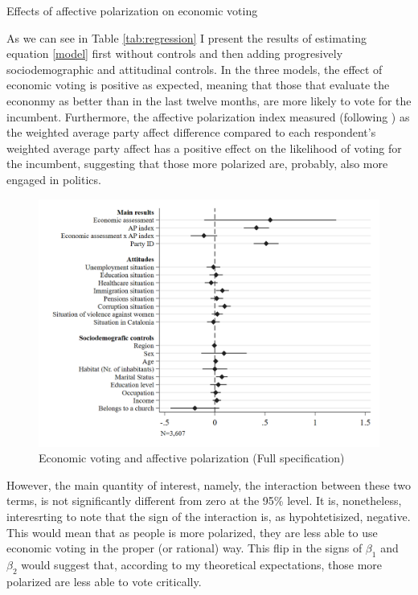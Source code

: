 \documentclass[a4paper, svgnames]{article}
\begin{document}
\begin{table}[H]
	\label{coefplot}
	\centering
	\caption{\label{tab:regression} Effects of affective polarization on economic voting}
	

\end{table}

As we can see in Table \ref*{tab:regression} I present the results of estimating equation \ref*{model} first without controls and then adding progresively sociodemographic and attitudinal controls. In the three models, the effect of economic voting is positive as expected, meaning that those that evaluate the econonmy as better than in the last twelve months, are more likely to vote for the incumbent. Furthermore, the affective polarization index measured (following \citep*{Wagner2021}) as the weighted average party affect difference compared to each respondent's weighted average party affect has a positive effect on the likelihood of voting for the incumbent, suggesting that those more polarized are, probably, also more engaged in politics.

\begin{figure}[H]
	\centering
	\includegraphics[scale=0.35]{Figures/model_3_coefplot.png}
	\caption{\label{fig:coefplot} Economic voting and affective polarization (Full specification)}
\end{figure}

However, the main quantity of interest, namely, the interaction between these two terms, is not significantly different from zero at the 95\% level. It is, nonetheless, interesrting to note that the sign of the interaction is, as hypohtetisized, negative. This would mean that as people is more polarized, they are less able to use economic voting in the proper (or rational) way. This flip in the signs of $\beta_1$ and $\beta_2$ would suggest that, according to my theoretical expectations, those more polarized are less able to vote critically.
\end{document}
